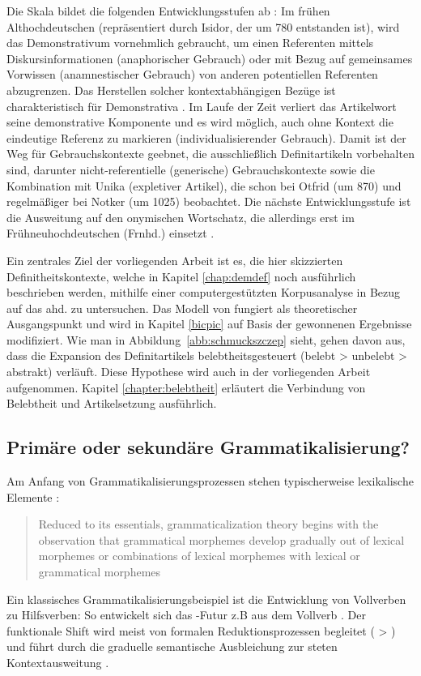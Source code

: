 Die Skala bildet die folgenden Entwicklungsstufen ab \parencite[vgl. auch][69--78]{Szczepaniak2011a}: Im frühen Althochdeutschen (repräsentiert durch Isidor, der um 780 entstanden ist), wird das Demonstrativum vornehmlich gebraucht, um einen Referenten mittels Diskursinformationen (anaphorischer Gebrauch) oder mit Bezug auf gemeinsames Vorwissen (anamnestischer Gebrauch) von anderen potentiellen Referenten abzugrenzen. Das Herstellen solcher kontextabhängigen Bezüge ist charakteristisch für Demonstrativa \parencite[85]{Himmelmann1997}. Im Laufe der Zeit verliert das Artikelwort  seine demonstrative Komponente und es wird möglich, auch ohne Kontext die eindeutige Referenz zu markieren (individualisierender Gebrauch). Damit ist der Weg für Gebrauchskontexte geebnet, die ausschließlich Definitartikeln vorbehalten sind, darunter nicht-referentielle (generische) Gebrauchskontexte sowie die Kombination mit Unika (expletiver Artikel), die \textcite{Oubouzar1989,Oubouzar1992} schon bei Otfrid (um 870) und regelmäßiger bei Notker (um 1025) beobachtet. Die nächste Entwicklungsstufe ist die Ausweitung auf den onymischen Wortschatz, die allerdings erst im Frühneuhochdeutschen (Frnhd.) einsetzt \parencite[s. ausführlich][]{Schmuck2014}. 

Ein zentrales Ziel der vorliegenden Arbeit ist es, die hier skizzierten Definitheitskontexte, welche in Kapitel \ref{chap:demdef} noch ausführlich beschrieben werden, mithilfe einer computergestützten Korpusanalyse in Bezug auf das ahd.  zu untersuchen. Das Modell von \textcite{Schmuck2014} fungiert als theoretischer Ausgangspunkt und wird in Kapitel \ref{bicpic} auf Basis der gewonnenen Ergebnisse modifiziert. Wie man in Abbildung~\ref{abb:schmuckszczep} sieht, gehen \textcite{Schmuck2014} davon aus, dass die Expansion des Definitartikels belebtheitsgesteuert (belebt > unbelebt > abstrakt) verläuft. Diese Hypothese wird auch in der vorliegenden Arbeit aufgenommen. Kapitel \ref{chapter:belebtheit} erläutert die Verbindung von Belebtheit und Artikelsetzung ausführlich. 

 
\subsection{Primäre oder sekundäre Grammatikalisierung?} \label{sec:dem-quelle}

Am Anfang von Grammatikalisierungsprozessen stehen typischerweise lexikalische Elemente \parencite[s. ausführlich][]{Heine1991,Hopper1991,Traugott1991,Bybee1994,Lehmann2015}:  \blockcquote[4]{Bybee1994}{Reduced to its essentials, grammaticalization theory begins with the observation that grammatical morphemes develop gradually out of lexical morphemes or combinations of lexical morphemes with lexical or grammatical morphemes}. 
Ein klassisches Grammatikalisierungsbeispiel ist die Entwicklung von Vollverben zu Hilfsverben: So entwickelt sich das -Futur z.B aus dem Vollverb  \parencite[s.][70--71]{Heine1991}. Der funktionale Shift wird meist von formalen Reduktionsprozessen begleitet ( > ) und führt durch die graduelle semantische Ausbleichung \parencite{Heine2003} zur steten Kontextausweitung \parencite{Himmelmann2004}.  

